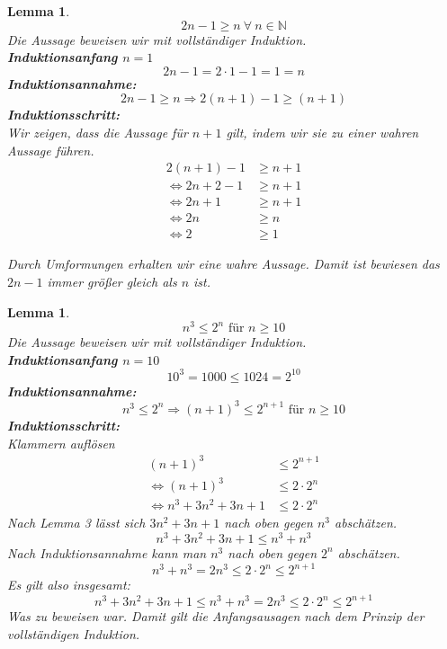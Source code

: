 \documentclass{article}
\begin{document}
    \newpage
    \newtheorem{lemma1}[lemma_counter]{Lemma}
    \begin{lemma1}
        \[ 2n -1 \geq n \: \forall \: n \in \mathbb{N} \]
        Die Aussage beweisen wir mit vollständiger Induktion. \\
        \textbf{Induktionsanfang \(n=1\)}
        \[2n - 1 = 2 \cdot 1 - 1 = 1 = n\]
        \textbf{Induktionsannahme:}
        \[2n - 1 \geq n \Rightarrow 2(n+1) -1 \geq (n+1)\]
        \textbf{Induktionsschritt:} \\
        Wir zeigen, dass die Aussage für \(n+1\) gilt, indem wir sie zu einer wahren Aussage führen.
        \begin{align*}
            2 (n+1) - 1 & \geq n + 1 \\
            \Leftrightarrow 2n + 2 - 1 & \geq n + 1 \\
            \Leftrightarrow 2n + 1 & \geq n + 1 \\
            \Leftrightarrow 2n & \geq n \\
            \Leftrightarrow 2 & \geq 1 
        \end{align*}
   
        Durch Umformungen erhalten wir eine wahre Aussage. Damit ist bewiesen das \(2n - 1\) immer größer gleich als \(n\) ist.
    \end{lemma1}

    \newtheorem{lemma2}[lemma_counter]{Lemma}
    \begin{lemma2}
        \[ n^3 \leq 2^n \text{ für } n \geq 10 \]
        Die Aussage beweisen wir mit vollständiger Induktion. \\
        \textbf{Induktionsanfang \(n=10\)}
        \[10^3 = 1000 \leq 1024 = 2^{10} \]
        \textbf{Induktionsannahme:}
        \[ n^3 \leq 2^n \Rightarrow {(n+1)}^3 \leq 2^{ n+1 } \text{ für } n \geq 10 \]
        \textbf{Induktionsschritt:} \\
        Klammern auflösen
        \begin{align*}
            {(n+1)}^3 & \leq 2^{ n+1 } \\
            \Leftrightarrow {(n+1)}^3 & \leq 2 \cdot 2^n \\
            \Leftrightarrow n^3 + 3n^2 + 3n + 1 & \leq 2 \cdot 2^n
        \end{align*} 
        Nach Lemma 3 lässt sich \(3n^2 + 3n + 1\) nach oben gegen \(n^3\) abschätzen.
        \[ n^3 + 3n^2 + 3n + 1 \leq n^3 + n^3 \]
        Nach Induktionsannahme kann man \(n^3\) nach oben gegen \(2^n\) abschätzen.
        \[ n^3 + n^3 = 2 n^3 \leq 2 \cdot 2^n \leq 2^{n+1} \]
        Es gilt also insgesamt:
        \[n^3 + 3n^2 + 3n + 1 \leq n^3 + n^3 = 2 n^3 \leq 2 \cdot 2^n \leq 2^{n+1} \]
        Was zu beweisen war. Damit gilt die Anfangsausagen nach dem Prinzip der vollständigen Induktion.
    \end{lemma2}
\end{document}
